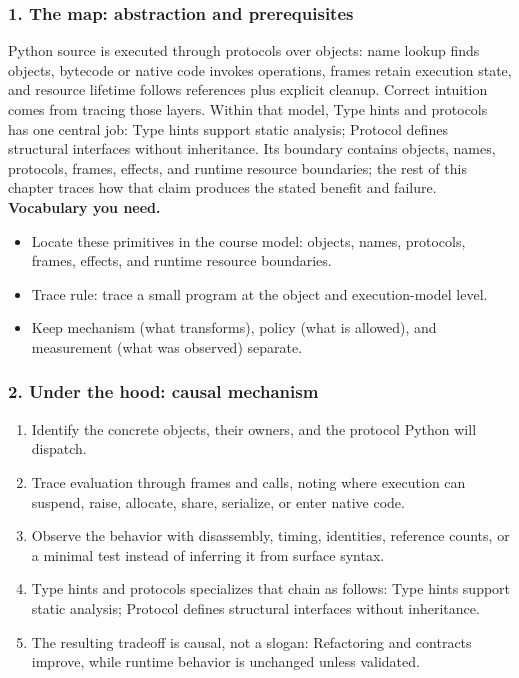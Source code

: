 \subsubsection*{1. The map: abstraction and prerequisites}
Python source is executed through protocols over objects: name lookup finds objects, bytecode or native code invokes operations, frames retain execution state, and resource lifetime follows references plus explicit cleanup. Correct intuition comes from tracing those layers.
Within that model, Type hints and protocols has one central job: Type hints support static analysis; Protocol defines structural interfaces without inheritance. Its boundary contains objects, names, protocols, frames, effects, and runtime resource boundaries; the rest of this chapter traces how that claim produces the stated benefit and failure.
\textbf{Vocabulary you need.}\begin{itemize}
\item Locate these primitives in the course model: objects, names, protocols, frames, effects, and runtime resource boundaries.
\item Trace rule: trace a small program at the object and execution-model level.
\item Keep mechanism (what transforms), policy (what is allowed), and measurement (what was observed) separate.
\end{itemize}
\subsubsection*{2. Under the hood: causal mechanism}\begin{enumerate}
\item Identify the concrete objects, their owners, and the protocol Python will dispatch.
\item Trace evaluation through frames and calls, noting where execution can suspend, raise, allocate, share, serialize, or enter native code.
\item Observe the behavior with disassembly, timing, identities, reference counts, or a minimal test instead of inferring it from surface syntax.
\item Type hints and protocols specializes that chain as follows: Type hints support static analysis; Protocol defines structural interfaces without inheritance.
\item The resulting tradeoff is causal, not a slogan: Refactoring and contracts improve, while runtime behavior is unchanged unless validated.
\end{enumerate}
